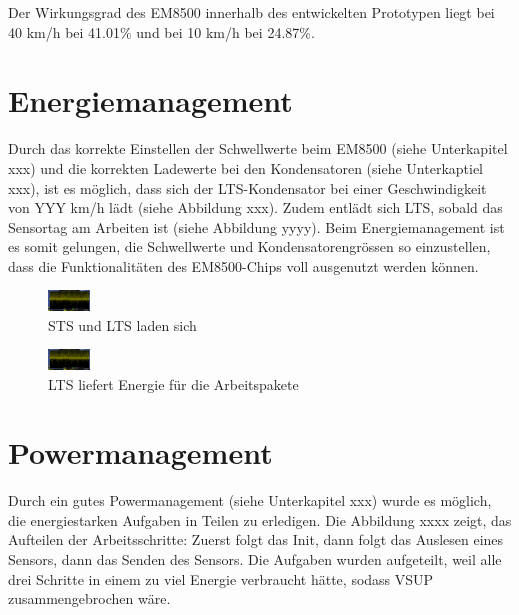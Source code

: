 Der Wirkungsgrad des EM8500 innerhalb des entwickelten Prototypen liegt bei 40 km/h  bei 41.01\thinspace\% und bei 10 km/h bei 24.87\thinspace\%.


\section{Energiemanagement}


Durch das korrekte Einstellen der Schwellwerte beim EM8500 (siehe Unterkapitel xxx) und die korrekten Ladewerte bei den Kondensatoren (siehe Unterkaptiel xxx), ist es möglich, dass sich der LTS-Kondensator bei einer Geschwindigkeit von YYY km/h lädt (siehe Abbildung xxx). Zudem entlädt sich LTS, sobald das Sensortag am Arbeiten ist (siehe Abbildung yyyy). Beim Energiemanagement ist es somit gelungen, die Schwellwerte und Kondensatorengrössen so einzustellen, dass die Funktionalitäten des EM8500-Chips voll ausgenutzt werden können.

\begin{figure}[ht]
    \includegraphics[width=0.1\textwidth]{4Resultate/imag/SpannungVCC.png} 
    \caption{STS und LTS laden sich}
\end{figure}

\begin{figure}[ht]
    \includegraphics[width=0.1\textwidth]{4Resultate/imag/SpannungVCC.png} 
    \caption{LTS liefert Energie für die Arbeitspakete}
\end{figure}


\section{Powermanagement}

Durch ein gutes Powermanagement (siehe Unterkapitel xxx) wurde es möglich, die energiestarken Aufgaben in Teilen zu erledigen. Die Abbildung xxxx zeigt, das Aufteilen der Arbeitsschritte: Zuerst folgt das Init, dann folgt das Auslesen eines Sensors, dann das Senden des Sensors. Die Aufgaben wurden aufgeteilt, weil alle drei Schritte in einem zu viel Energie verbraucht hätte, sodass VSUP zusammengebrochen wäre.

